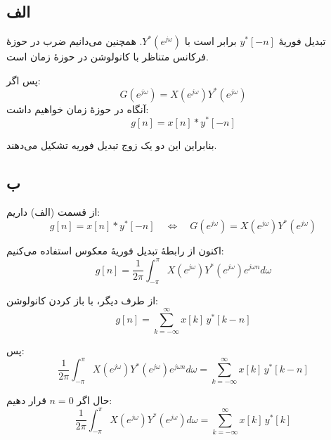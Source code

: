 \subsection*{الف}

تبدیل فوریهٔ $y^*[-n]$ برابر است با $Y^*(e^{j\omega})$.
همچنین می‌دانیم ضرب در حوزهٔ فرکانس متناظر با کانولوشن در حوزهٔ زمان است.

پس اگر:
\[
G(e^{j\omega}) = X(e^{j\omega}) Y^*(e^{j\omega})
\]
آنگاه در حوزهٔ زمان خواهیم داشت:
\[
g[n] = x[n] * y^*[-n]
\]

بنابراین این دو یک زوج تبدیل فوریه تشکیل می‌دهند.

\subsection*{ب}

از قسمت (الف) داریم:
\[
g[n] = x[n] * y^*[-n]
\quad \Longleftrightarrow \quad
G(e^{j\omega}) = X(e^{j\omega})Y^*(e^{j\omega})
\]

اکنون از رابطهٔ تبدیل فوریهٔ معکوس استفاده می‌کنیم:
\[
g[n] =
\frac{1}{2\pi}
\int_{-\pi}^{\pi}
X(e^{j\omega})Y^*(e^{j\omega}) e^{j\omega n} d\omega
\]

از طرف دیگر، با باز کردن کانولوشن:
\[
g[n] = \sum_{k=-\infty}^{\infty} x[k]\, y^*[k-n]
\]

پس:
\[
\frac{1}{2\pi}
\int_{-\pi}^{\pi}
X(e^{j\omega})Y^*(e^{j\omega}) e^{j\omega n} d\omega
=
\sum_{k=-\infty}^{\infty} x[k]\, y^*[k-n]
\]

حال اگر $n=0$ قرار دهیم:
\[
\frac{1}{2\pi}
\int_{-\pi}^{\pi}
X(e^{j\omega})Y^*(e^{j\omega}) d\omega
=
\sum_{k=-\infty}^{\infty} x[k]\, y^*[k]
\]
